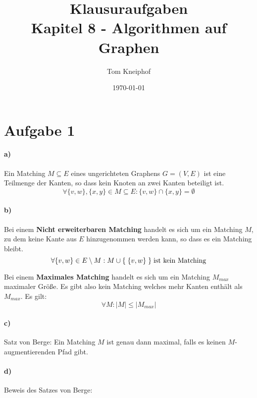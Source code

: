 \documentclass[10pt,a4paper]{article}
\begin{document}
\title{Klausuraufgaben \\
\small{Kapitel 8 - Algorithmen auf Graphen}}
\author{Tom Kneiphof}
\date{\today}
\maketitle

\section*{Aufgabe 1}

\paragraph{a)}
Ein Matching $M \subseteq E$ eines ungerichteten Graphens $G = (V, E)$ ist eine Teilmenge der Kanten, so dass kein Knoten an zwei Kanten beteiligt ist.
\begin{equation*}
\forall \{v,w\}, \{x, y\} \in M \subseteq E : \{v, w\} \cap \{x, y\} = \emptyset
\end{equation*}


\paragraph{b)}
Bei einem \textbf{Nicht erweiterbaren Matching} handelt es sich um ein Matching $M$, zu dem keine Kante aus $E$ hinzugenommen werden kann, so dass es ein Matching bleibt.
\begin{equation*}
\forall \{v, w\} \in E \setminus M : M \cup \{ \; \{v, w\} \; \} \; \textnormal{ist kein Matching}
\end{equation*}

Bei einem \textbf{Maximales Matching} handelt es sich um ein Matching $M_{max}$ maximaler Gr\"o{\ss}e.
Es gibt also kein Matching welches mehr Kanten enth\"alt als $M_{max}$. Es gilt:
\begin{equation*}
\forall M : | M | \leq | M_{max} |
\end{equation*}


\paragraph{c)}
Satz von Berge: Ein Matching $M$ ist genau dann maximal, falls es keinen $M$-augmentierenden Pfad gibt.

\paragraph{d)}
Beweis des Satzes von Berge:
\end{document}
